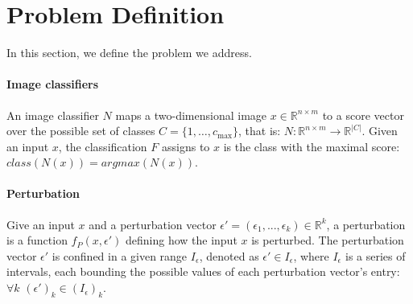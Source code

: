 \documentclass[11pt]{article}
\begin{document}
\section{Problem Definition}
In this section, we define the problem we address.

\paragraph{Image classifiers}
An image classifier $N$ maps a two-dimensional image $x\in \mathbb{R}^{n \times m}$ to a score vector over the possible set of classes $C=\{1,\ldots,c_\text{max}\}$, that is:
$N: \mathbb{R}^{n \times m} \rightarrow {\mathbb{R}}^{|C|}$.
Given an input $x$, the classification $F$ assigns to $x$ is the class with the maximal score: $class(N(x))=argmax(N(x))$.

\paragraph{Perturbation}
Give an input $x$ and a perturbation vector $\epsilon'=(\epsilon_1,...,\epsilon_k)\in{\mathbb{R}}^{k}$, a perturbation is a function $f_P(x,\epsilon')$ defining how the input $x$ is perturbed. The perturbation vector $\epsilon'$ is confined in a given range $I_\epsilon$, denoted as $\epsilon'\in I_\epsilon$, where $I_\epsilon$ is a series of intervals, each bounding the possible values of each perturbation vector's entry: $\forall{k}$ $(\epsilon')_k\in (I_\epsilon)_k$.
\end{document}
